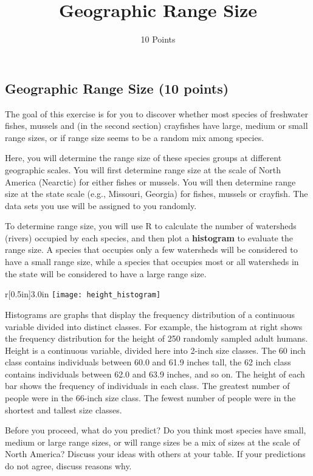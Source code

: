 \documentclass[11pt]{article}
\title{Geographic Range Size}
\author{10 Points}
\date{}                                           %
\begin{document}
\thispagestyle{first_page}

\subsection*{Geographic Range Size (10 points)}

The goal of this exercise is for you to discover whether most species of
freshwater fishes, mussels and (in the second section) crayfishes have
large, medium or small range sizes, or if range size seems to be a
random mix among species.

Here, you will determine the range size of these species groups at
different geographic scales. You will first determine range size at the
scale of North America (Nearctic) for either fishes or mussels. You will
then determine range size at the state scale (e.g., Missouri, Georgia)
for fishes, mussels or crayfish. The data sets you use will be assigned
to you randomly.

To determine range
size, you will use R to calculate the number of watersheds (rivers)
occupied by each species, and then plot a \textbf{histogram} to evaluate
the range size. A species that occupies only a few watersheds will be
considered to have a small range size, while a species that occupies
most or all watersheds in the state will be considered to have a large
range size.

\begin{wrapfigure}[17]{r}[0.5in]{3.0in}
	\texttt{[image: height\_histogram]}
\end{wrapfigure}
Histograms are graphs that display
the frequency distribution of a continuous variable divided into distinct
classes. For example, the histogram at right shows the frequency distribution for
the height of 250 randomly sampled adult humans. Height is a continuous variable, divided here into 2-inch size classes.
The 60 inch class contains individuals between 60.0 and 61.9 inches tall,
the 62 inch class contains individuals between 62.0 and 63.9 inches, and so on. The 
height of each bar shows the frequency of individuals in each class. The greatest
number of people were in the 66-inch size class. The fewest number of people were
in the shortest and tallest size classes.




Before you proceed, what do you predict? Do you think most species
have small, medium or large range sizes, or will range sizes be a mix of
sizes at the scale of North America? Discuss your ideas with others at your table. If
your predictions do not agree, discuss reasons why.
\end{document}
